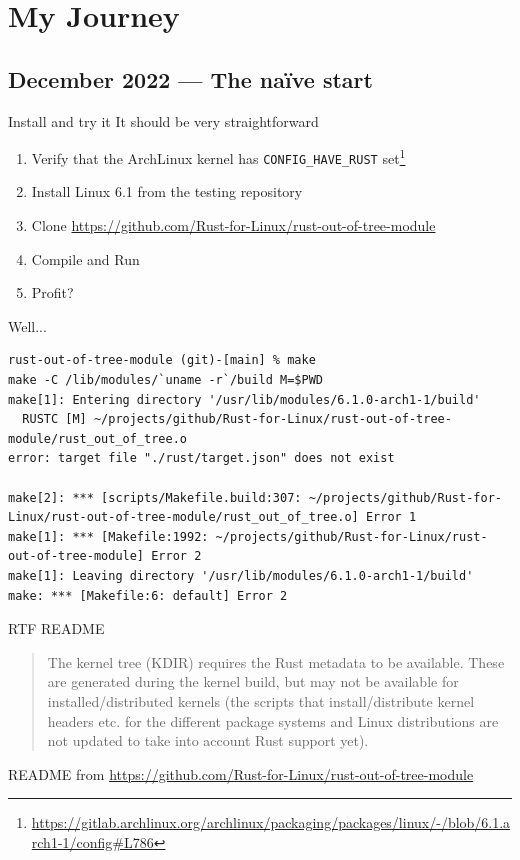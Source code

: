 \section{My Journey}

\subsection{December 2022 — The naïve start}

\begin{frame}[c,fragile]{Install and try it}
  It should be very straightforward
  \begin{enumerate}
    \item Verify that the ArchLinux kernel has \texttt{CONFIG\_HAVE\_RUST} set\footnote{\url{https://gitlab.archlinux.org/archlinux/packaging/packages/linux/-/blob/6.1.arch1-1/config\#L786}}
    \item Install Linux 6.1 from the testing repository
    \item Clone \url{https://github.com/Rust-for-Linux/rust-out-of-tree-module}
    \item Compile and Run
    \pause \item Profit?
  \end{enumerate}
\end{frame}

\begin{frame}[c,fragile]{Well...}
\begin{verbatim}
rust-out-of-tree-module (git)-[main] % make
make -C /lib/modules/`uname -r`/build M=$PWD
make[1]: Entering directory '/usr/lib/modules/6.1.0-arch1-1/build'
  RUSTC [M] ~/projects/github/Rust-for-Linux/rust-out-of-tree-module/rust_out_of_tree.o
error: target file "./rust/target.json" does not exist

make[2]: *** [scripts/Makefile.build:307: ~/projects/github/Rust-for-Linux/rust-out-of-tree-module/rust_out_of_tree.o] Error 1
make[1]: *** [Makefile:1992: ~/projects/github/Rust-for-Linux/rust-out-of-tree-module] Error 2
make[1]: Leaving directory '/usr/lib/modules/6.1.0-arch1-1/build'
make: *** [Makefile:6: default] Error 2
\end{verbatim}
\end{frame}

\begin{frame}[c,fragile]{RTF README}
\begin{quote}
The kernel tree (KDIR) requires the Rust metadata to be available. These are
generated during the kernel build, but may not be available for
installed/distributed kernels (the scripts that install/distribute kernel
headers etc. for the different package systems and Linux distributions are not
updated to take into account Rust support yet).
\end{quote}
README from \url{https://github.com/Rust-for-Linux/rust-out-of-tree-module}
\end{frame}

